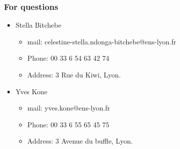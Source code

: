 \documentclass[xcolor=table,bigger,unknownkeysallowed]{beamer}
\begin{document}
\begin{frame}
	\frametitle{For questions}
	\begin{itemize}
		\item Stella Bitchebe
		\begin{itemize}
			\item mail: celestine-stella.ndonga-bitchebe@ens-lyon.fr
			\item Phone: 00 33 6 54 63 42 74
			\item Address: 3 Rue du Kiwi, Lyon.
		\end{itemize}
		\item Yves Kone
		\begin{itemize}
			\item mail: yves.kone@ens-lyon.fr
			\item Phone: 00 33 6 55 65 45 75
			\item Address: 3 Avenue du buffle, Lyon.
		\end{itemize}		
	\end{itemize}
\end{frame}
      
\end{document}
